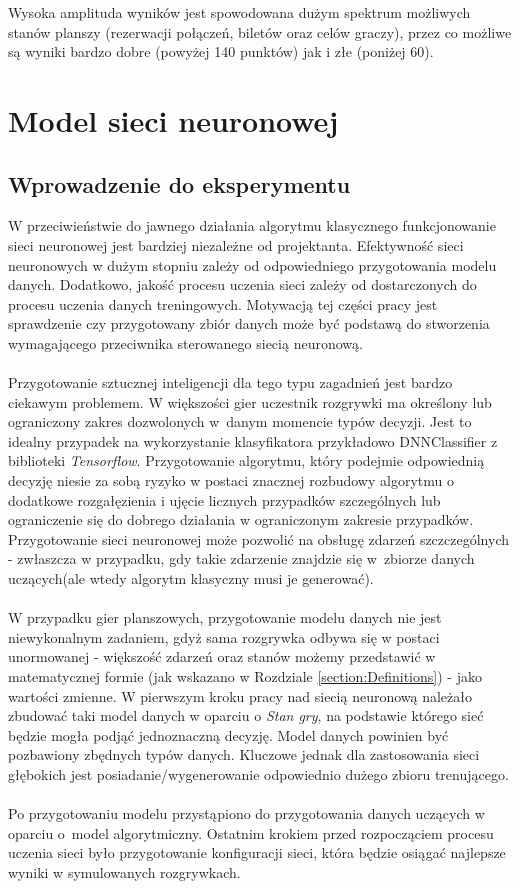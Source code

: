 \documentclass[12pt, oneside]{report}
\begin{document}
	Wysoka amplituda wyników jest spowodowana dużym spektrum możliwych stanów planszy (rezerwacji połączeń, biletów oraz celów graczy), przez co możliwe są wyniki bardzo dobre (powyżej 140 punktów) jak i złe (poniżej 60). 
	\chapter{Model sieci neuronowej}
	\section{Wprowadzenie do eksperymentu}
	W przeciwieństwie do jawnego działania algorytmu klasycznego 
	funkcjonowanie sieci neuronowej jest bardziej niezależne od projektanta. Efektywność sieci neuronowych w dużym stopniu zależy od odpowiedniego przygotowania modelu danych. Dodatkowo, jakość procesu uczenia sieci zależy od dostarczonych do procesu uczenia danych treningowych. Motywacją tej części pracy jest sprawdzenie czy przygotowany zbiór danych może być podstawą do stworzenia wymagającego przeciwnika sterowanego siecią neuronową. \\ \\
	Przygotowanie sztucznej inteligencji dla tego typu zagadnień jest bardzo ciekawym problemem. W większości gier uczestnik rozgrywki ma określony lub ograniczony zakres dozwolonych w~danym momencie typów decyzji. Jest to idealny przypadek na wykorzystanie klasyfikatora przykładowo DNNClassifier z biblioteki \textit{Tensorflow}. Przygotowanie algorytmu, który podejmie odpowiednią decyzję niesie za sobą ryzyko w postaci znacznej rozbudowy algorytmu o dodatkowe rozgałęzienia i ujęcie licznych przypadków szczególnych lub ograniczenie się do dobrego działania w ograniczonym zakresie przypadków. Przygotowanie sieci neuronowej może pozwolić na obsługę zdarzeń szczczególnych - zwłaszcza w przypadku, gdy takie zdarzenie znajdzie się w~zbiorze danych uczących(ale wtedy algorytm klasyczny musi je generować).
	\\ \\ W przypadku gier planszowych, przygotowanie modelu danych nie jest niewykonalnym zadaniem, gdyż sama rozgrywka odbywa się w postaci unormowanej - większość zdarzeń oraz stanów możemy przedstawić w matematycznej formie (jak wskazano w Rozdziale \ref{section:Definitions}) - jako wartości zmienne. W pierwszym kroku pracy nad siecią neuronową należało zbudować taki model danych w oparciu o \textit{Stan gry}, na podstawie którego sieć będzie mogła podjąć jednoznaczną decyzję. Model danych powinien być pozbawiony zbędnych typów danych.
	Kluczowe jednak dla zastosowania sieci głębokich jest posiadanie/wygenerowanie odpowiednio dużego zbioru trenującego.
	\\ \\ Po przygotowaniu modelu przystąpiono do przygotowania danych uczących w oparciu o~model algorytmiczny. Ostatnim krokiem przed rozpocząciem procesu uczenia sieci było przygotowanie konfiguracji sieci, która będzie osiągać najlepsze wyniki w symulowanych rozgrywkach.
\end{document}
